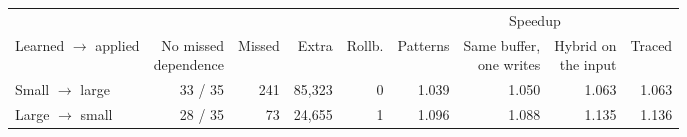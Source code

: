 \begin{tabular}{lrrrrrrrr}
\toprule
 & & & & & \multicolumn{4}{c}{Speedup} \\
\cmidrule(lr){6-9}
Learned $\rightarrow$ applied & \shortstack{No missed\\dependence} & Missed & Extra & Rollb. & Patterns & \shortstack{Same buffer,\\one writes} & \shortstack{Hybrid on\\the input} & Traced \\
\midrule
Small $\rightarrow$ large & 33 / 35 & 241 & 85,323 & 0 & 1.039 & 1.050 & 1.063 & 1.063 \\
Large $\rightarrow$ small & 28 / 35 & 73 & 24,655 & 1 & 1.096 & 1.088 & 1.135 & 1.136 \\
\bottomrule
\end{tabular}

